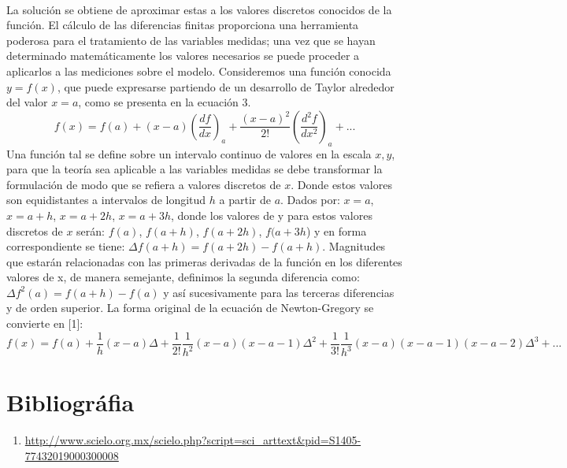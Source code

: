 \documentclass[12pt]{article}
\begin{document}
\\
La solución se obtiene de aproximar estas a los valores discretos conocidos de la función. El cálculo de las diferencias finitas proporciona una herramienta poderosa para el tratamiento de las variables medidas; una vez que se hayan determinado matemáticamente los valores necesarios se puede proceder a aplicarlos a las mediciones sobre el modelo. Consideremos una función conocida $y=f(x)$, que puede expresarse partiendo de un desarrollo de Taylor alrededor del valor $x = a$, como se presenta en la ecuación 3.
\begin{equation}
	f(x) = f(a)+(x-a)\left(\dfrac{df}{dx}\right)_a + \frac{(x-a)^2}{2!} \left(\dfrac{d^2f}{dx^2}\right)_a + ...
\end{equation}
Una función tal se define sobre un intervalo continuo de valores en la escala $x,y$, para que la teoría sea aplicable a las variables medidas se debe transformar la formulación de modo que se refiera a valores discretos de $x$. Donde estos valores son equidistantes a intervalos de longitud $h$ a partir de $a$. Dados por: $x=a$, $x=a+h$, $x=a+2h$, $x=a+3h$, donde los valores de y para estos valores discretos de $x$ serán: $f(a)$, $f(a+h)$, $f(a+2h)$, $f(a+3h$) y en forma correspondiente se tiene: $\Delta{}f(a+h)=f(a+2h)-f(a+h)$. Magnitudes que estarán relacionadas con las primeras derivadas de la función en los diferentes valores de x, de manera semejante, definimos la segunda diferencia como: $\Delta{}f^2(a)=f(a+h)-f(a)$ y así sucesivamente para las terceras diferencias y de orden superior. La forma original de la ecuación de Newton-Gregory se convierte en [1]:
\begin{equation}
	f(x) = f(a) + \frac{1}{h}(x-a)\Delta + \frac{1}{2!}\frac{1}{h^2}(x-a)(x-a-1)\Delta^2 + \frac{1}{3!}\frac{1}{h^3}(x-a)(x-a-1)(x-a-2)\Delta^3 + ...
\end{equation}
\section*{Bibliográfia}
\begin{enumerate}
	\item \url{http://www.scielo.org.mx/scielo.php?script=sci_arttext&pid=S1405-77432019000300008}
\end{enumerate}
\end{document}
